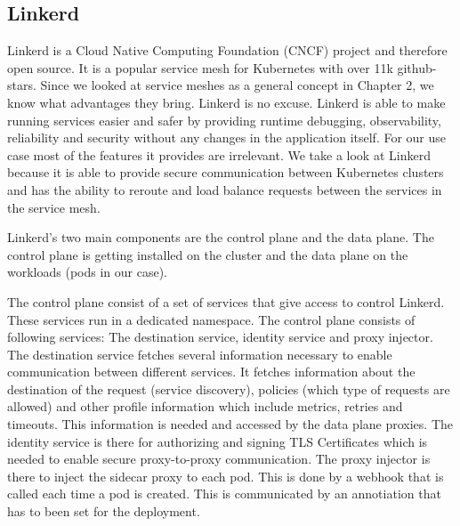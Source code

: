 %
\subsection{Linkerd}
%
Linkerd is a Cloud Native Computing Foundation (CNCF) project and therefore open source. 
It is a popular service mesh for Kubernetes with over 11k github-stars.
Since we looked at service meshes as a general concept in Chapter 2, we know what advantages they bring.
Linkerd is no excuse.
Linkerd is able to make running services easier and safer by providing runtime debugging, observability, reliability and security without any changes in the application itself.
For our use case most of the features it provides are irrelevant.
We take a look at Linkerd because it is able to provide secure communication between Kubernetes clusters and has the ability to reroute and load balance requests between the services in the service mesh.

Linkerd's two main components are the control plane and the data plane.
The control plane is getting installed on the cluster and the data plane on the workloads (pods in our case).

The control plane consist of a set of services that give access to control Linkerd. 
These services run in a dedicated namespace.
The control plane consists of following services: The destination service, identity service and proxy injector.
The destination service fetches several information necessary to enable communication between different services. 
It fetches information about the destination of the request (service discovery), policies (which type of requests are allowed) and other profile information which include metrics, retries and timeouts.
This information is needed and accessed by the data plane proxies.
The identity service is there for authorizing and signing TLS Certificates which is needed to enable secure proxy-to-proxy communication.
The proxy injector is there to inject the sidecar proxy to each pod. This is done by a webhook that is called each time a pod is created. This is communicated by an annotiation that has to been set for the deployment.  

